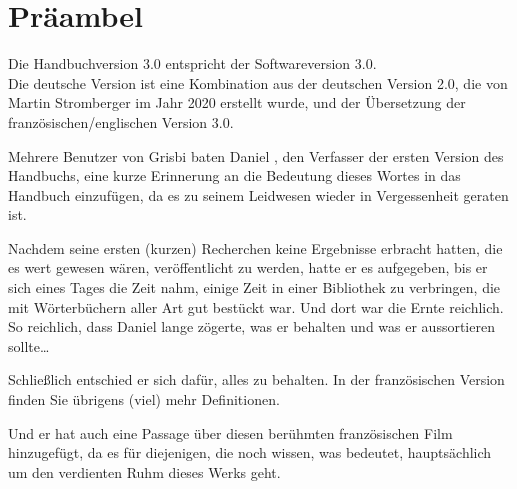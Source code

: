 \chapter{Präambel\label{preamble}}



Die Handbuchversion 3.0 entspricht der Softwareversion 3.0.\\

Die deutsche Version ist eine Kombination aus der deutschen Version 2.0, die von Martin Stromberger im Jahr 2020 erstellt wurde, und der Übersetzung der französischen/englischen Version 3.0.

Mehrere Benutzer von \gls{Grisbi} baten Daniel , den Verfasser der ersten Version des Handbuchs, eine kurze Erinnerung an die Bedeutung dieses Wortes in das Handbuch einzufügen, da es zu seinem Leidwesen wieder in Vergessenheit geraten ist.

Nachdem seine ersten (kurzen) Recherchen keine Ergebnisse erbracht hatten, die es wert gewesen wären, veröffentlicht zu werden, hatte er es aufgegeben, bis er sich eines Tages die Zeit nahm, einige Zeit in einer Bibliothek zu verbringen, die mit Wörterbüchern aller Art gut bestückt war. Und dort war die Ernte reichlich. So reichlich, dass Daniel  lange zögerte, was er behalten und was er aussortieren sollte\dots{}

Schließlich entschied er sich dafür, alles zu behalten. In der französischen Version finden Sie übrigens (viel) mehr Definitionen.

Und er hat auch eine Passage über diesen berühmten französischen Film hinzugefügt, da es für diejenigen, die noch wissen, was  bedeutet, hauptsächlich um den verdienten Ruhm dieses Werks geht.


